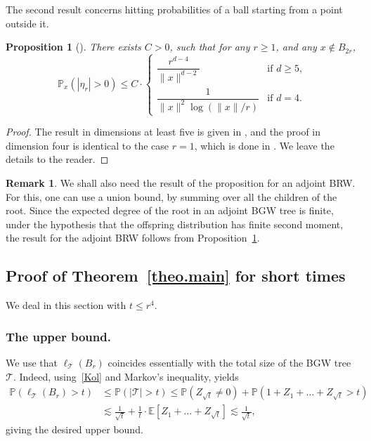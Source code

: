 \documentclass[11pt]{article}
\numberwithin{equation}{section}
\theoremstyle{plain}
\newtheorem{proposition}[theorem]{Proposition}
\theoremstyle{definition}
\newtheorem{remark}[theorem]{Remark}
\newcommand\T{\mathcal{T}}
\newcommand{\1}{{\text{\Large $\mathfrak 1$}}}
\begin{document}
The second result concerns hitting probabilities of a ball starting from a point outside it.

\begin{proposition}[\cite{Zhu1,Zhu4}] \label{prop.hit.upper}
There exists $C>0$, such that for any $r\ge 1$, and any $x\notin B_{2r}$,
\begin{equation*}
\mathbb P_x(|\eta_r|>0) \le C\cdot
\begin{cases}
\dfrac{r^{d-4}}{\|x\|^{d-2}} & \text{if }d\ge 5, \\
\dfrac 1{\|x\|^2\log (\|x\|/r) }& \text{if }d=4.
\end{cases}
\end{equation*}
\end{proposition}
\begin{proof}
The result in dimensions at least five is given in \cite{Zhu1}, and the proof in dimension four is identical to the case $r=1$, which is done in \cite{Zhu4}.
We leave the details to the reader.
\end{proof}

\begin{remark}\label{rem.hit.adjoint}
We shall also need the result of the proposition for an adjoint BRW. For this, one can use a union bound, by summing over all the children of the root. Since the expected degree of the root in an adjoint BGW tree is finite, under the hypothesis that the offspring distribution has finite second moment, the result for the adjoint BRW follows from Proposition~\ref{prop.hit.upper}.
\end{remark}

\subsection{Proof of Theorem~\ref{theo.main} for short times}

We deal in this section with $t\le r^4$.

\subsubsection*{The upper bound.}
We use that $\ell_\T(B_r)$ coincides
essentially with the total size of the BGW tree $\T$.
Indeed, using~\eqref{Kol} and Markov's inequality, yields
\begin{align*}
\mathbb P(\ell_\T(B_r) > t) &
\le \mathbb P(|\mathbf{\mathcal T}|>t) \le \mathbb P(Z_{\sqrt t}\neq 0) + \mathbb P(1+Z_1+\dots + Z_{\sqrt t} > t) \\
&\lesssim \frac 1{\sqrt t} + \frac 1t \cdot \mathbb E[Z_1+\dots+ Z_{\sqrt t}] \lesssim \frac 1{\sqrt t},
\end{align*}
giving the desired upper bound.
\end{document}
